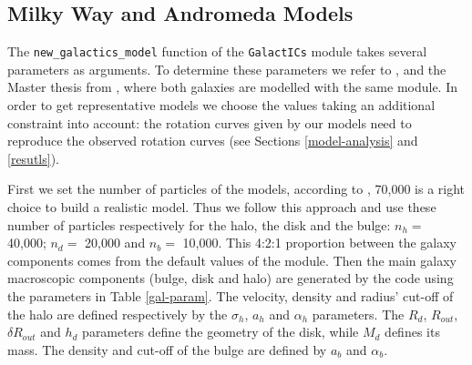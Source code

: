 \documentclass[a4paper,12pt, english]{article}
\begin{document}
\subsection{Milky Way and Andromeda Models}
\label{mw-m31-models}
The \texttt{new\_galactics\_model} function of the \texttt{GalactICs} module takes several parameters as arguments. To determine these parameters we refer to \textcite{Widrow_2005}, \textcite{Widrow_2008} and the Master thesis from \textcite{Withagen_2019}, where both galaxies are modelled with the same module. In order to get representative models we choose the values taking an additional constraint into account: the rotation curves given by our models need to reproduce the observed rotation curves (see Sections \ref{model-analysis} and \ref{resutls}).\par
\smallskip
First we set the number of particles of the models, according to \textcite{Withagen_2019}, 70,000 is a right choice to build a realistic model. Thus we follow this approach and use these number of particles respectively for the halo, the disk and the bulge: \(n_{h} =\) 40,000; \(n_{d} =\) 20,000 and \(n_{b} =\) 10,000. This 4:2:1 proportion between the galaxy components comes from the default values of the module. Then the main galaxy macroscopic components (bulge, disk and halo) are generated by the code using the parameters in Table \ref{gal-param}. The velocity, density and radius' cut-off of the halo are defined respectively by the \(\sigma_{h}\), \(a_{h}\) and \(\alpha_{h}\) parameters. The \(R_{d}\), \(R_{out}\), \(\delta R_{out}\) and \(h_{d}\) parameters define the geometry of the disk, while \(M_{d}\) defines its mass. The density and cut-off of the bulge are defined by \(a_{b}\) and \(\alpha_{b}\).\par
\end{document}
